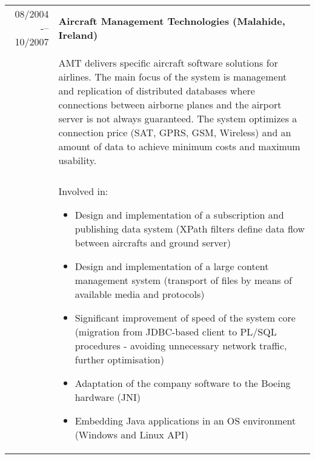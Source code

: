 \documentclass[a4paper,10pt]{article}
\begin{document}
\bigskip

\begin{tabular}{rp{11cm}}
08/2004 -– 10/2007 & \textbf{Aircraft Management Technologies (Malahide, Ireland)}\\\\

& AMT delivers specific aircraft software solutions for airlines. The main focus of the system is management and replication of distributed databases where connections between airborne planes and the airport server is not always guaranteed. The system optimizes a connection price (SAT, GPRS, GSM, Wireless) and an amount of data to achieve minimum costs and maximum usability.\\\\

& Involved in:
\begin{itemize}
\item Design and implementation of a subscription and publishing data system (XPath filters define data flow between aircrafts and ground server)
\item Design and implementation of a large content management system (transport of files by means of available media and protocols)
\item Significant improvement of speed of the system core (migration from JDBC-based client to PL/SQL procedures - avoiding unnecessary network traffic, further optimisation)
\item Adaptation of the company software to the Boeing hardware (JNI)
\item Embedding Java applications in an OS environment (Windows and Linux API)
\end{itemize}
\end{tabular}

\bigskip
\end{document}
